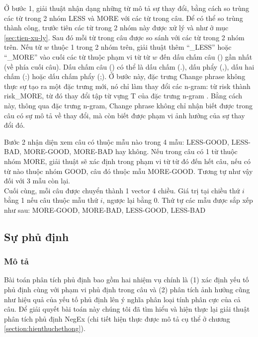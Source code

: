 Ở bước 1, giải thuật nhận dạng những từ mô tả sự thay đổi, bằng cách so trùng các từ trong 2 nhóm LESS và MORE với các từ trong câu. Để có thể so trùng thành công, trước tiên các từ trong 2 nhóm này được xử lý  và  như ở mục \ref{sec:tien-xu-ly}. Sau đó mỗi từ trong câu được so sánh với các từ trong 2 nhóm trên. Nếu từ $w$ thuộc 1 trong 2 nhóm trên, giải thuật thêm  ``\_LESS'' hoặc ``\_MORE'' vào cuối các từ thuộc phạm vi từ từ $w$ đến dấu chấm câu () gần nhất (về phía cuối câu). Dấu chấm câu () có thể là dấu chấm (.), dấu phẩy (,), dấu hai chấm (:) hoặc dấu chấm phẩy (;). Ở bước này, đặc trưng Change phrase không thực sự tạo ra một đặc trưng mới, nó chỉ làm thay đổi các n-gram: từ risk thành risk\_MORE, từ đó thay đổi tập từ vựng T của đặc trưng n-gram . Bằng cách này, thông qua đặc trưng n-gram, Change phrase không chỉ nhận biết được trong câu có sự mô tả về thay đổi, mà còn biết được phạm vi ảnh hưởng của sự thay đổi đó.\\


Bước 2 nhận diện xem câu có thuộc mẫu nào trong 4 mẫu: LESS-GOOD, LESS-BAD, MORE-GOOD, MORE-BAD hay không. Nếu trong câu có 1 từ thuộc nhóm MORE, giải thuật sẽ xác định trong phạm vi từ từ đó đến hết câu, nếu có từ nào thuộc nhóm GOOD, câu đó thuộc mẫu MORE-GOOD. Tương tự như vậy đối với 3 mẫu còn lại.\\

Cuối cùng, mỗi câu được chuyển thành 1 vector 4 chiều. Giá trị tại chiều thứ $i$ bằng 1 nếu câu thuộc mẫu thứ $i$, ngược lại bằng 0. Thứ tự các mẫu được sắp xếp như sau: MORE-GOOD, MORE-BAD, LESS-GOOD, LESS-BAD

\subsection{Sự phủ định}
\subsubsection*{Mô tả}
Bài toán phân tích phủ định bao gồm hai nhiệm vụ chính là (1) xác định yếu tố phủ định cùng với phạm vi phủ định trong câu và (2) phân tích ảnh hưởng cũng như hiệu quả của yếu tố phủ định lên ý nghĩa phân loại tính phân cực của cả câu. Để giải quyết bài toán này chúng tôi đã tìm hiểu và hiện thực lại giải thuật phân tích phủ định NegEx\cite{Tanushi2013} (chi tiết hiện thực được mô tả cụ thể ở chương \ref{section:hienthuchethong}).\\


